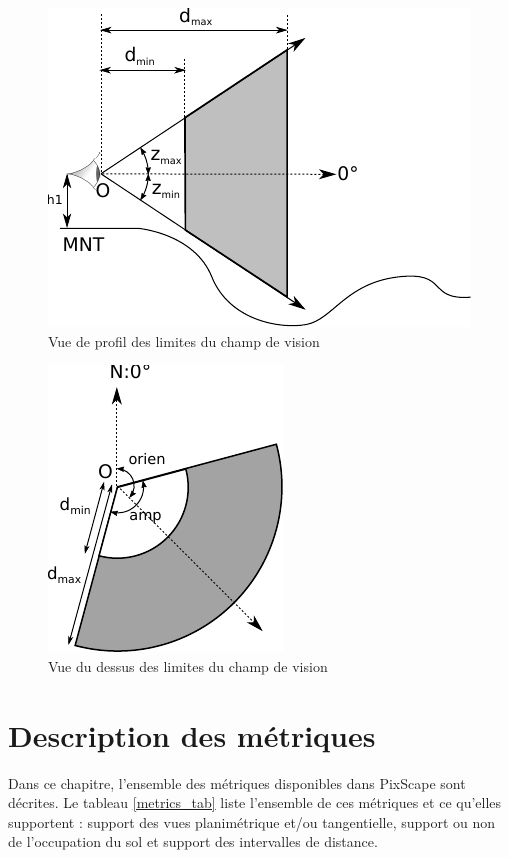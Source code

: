 \documentclass{report}
\begin{document}
\begin{figure}[H]
	\includegraphics{img/bounds_side.pdf} 
	\caption{Vue de profil des limites du champ de vision}
	\label{bounds_side}
\end{figure}

\begin{figure}[H]
	\includegraphics{img/bounds_2d.pdf} 
	\caption{Vue du dessus des limites du champ de vision}
	\label{bounds_2d}
\end{figure}


\chapter{Description des métriques}
\label{metrics}
Dans ce chapitre, l'ensemble des métriques disponibles dans PixScape sont décrites. Le tableau \ref{metrics_tab} liste l'ensemble de ces métriques et ce qu'elles supportent : support des vues planimétrique et/ou tangentielle, support ou non de l'occupation du sol et support des intervalles de distance.
\end{document}
